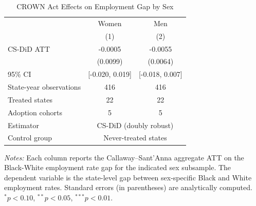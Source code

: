 \begin{table}[htbp]
\centering
\caption{CROWN Act Effects on Employment Gap by Sex}
\label{tab:sex_heterogeneity}
\begin{tabular}{lcc}
\toprule
 & Women & Men \\
 & (1) & (2) \\
\midrule
CS-DiD ATT & -0.0005 & -0.0055 \\
 & (0.0099) & (0.0064) \\
95\% CI & [-0.020, 0.019] & [-0.018, 0.007] \\
\midrule
State-year observations & 416 & 416 \\
Treated states & 22 & 22 \\
Adoption cohorts & 5 & 5 \\
Estimator & \multicolumn{2}{c}{CS-DiD (doubly robust)} \\
Control group & \multicolumn{2}{c}{Never-treated states} \\
\bottomrule
\end{tabular}
\begin{tablenotes}[flushleft]
\small
\item \textit{Notes:} Each column reports the Callaway--Sant'Anna aggregate ATT on the Black-White employment rate gap for the indicated sex subsample. The dependent variable is the state-level gap between sex-specific Black and White employment rates. Standard errors (in parentheses) are analytically computed. $^{*}p<0.10$, $^{**}p<0.05$, $^{***}p<0.01$.
\end{tablenotes}
\end{table}
